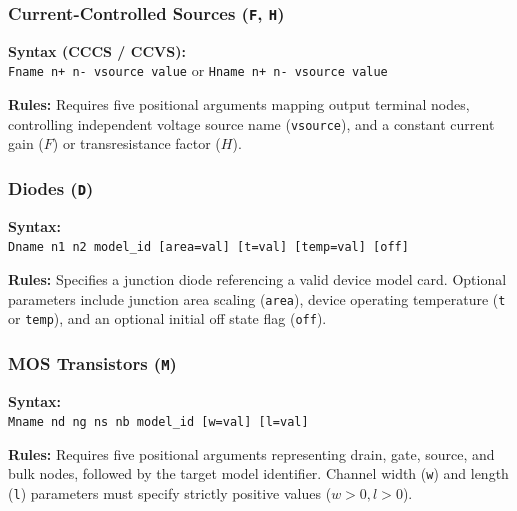 \subsubsection{Current-Controlled Sources (\texttt{F}, \texttt{H})}
\begin{compactitem}
    \item \textbf{Syntax (CCCS / CCVS):} \\
    \texttt{Fname n+ n- vsource value} or \texttt{Hname n+ n- vsource value}
    \item \textbf{Rules:} Requires five positional arguments mapping output terminal nodes, controlling independent voltage source name (\texttt{vsource}), and a constant current gain ($F$) or transresistance factor ($H$).
\end{compactitem}

\subsubsection{Diodes (\texttt{D})}
\begin{compactitem}
    \item \textbf{Syntax:} \\
    \texttt{Dname n1 n2 model\_id [area=val] [t=val] [temp=val] [off]}
    \item \textbf{Rules:} Specifies a junction diode referencing a valid device model card. Optional parameters include junction area scaling (\texttt{area}), device operating temperature (\texttt{t} or \texttt{temp}), and an optional initial off state flag (\texttt{off}).
\end{compactitem}

\subsubsection{MOS Transistors (\texttt{M})}
\begin{compactitem}
    \item \textbf{Syntax:} \\
    \texttt{Mname nd ng ns nb model\_id [w=val] [l=val]}
    \item \textbf{Rules:} Requires five positional arguments representing drain, gate, source, and bulk nodes, followed by the target model identifier. Channel width (\texttt{w}) and length (\texttt{l}) parameters must specify strictly positive values ($w > 0, l > 0$).
\end{compactitem}

